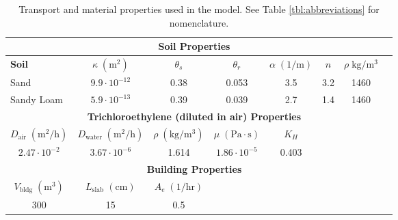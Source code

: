 \begin{table}[htb!]
  \setlength{\tabcolsep}{1pt}
  \centering
  \begin{tabular}{l c c c c c c c}
    \toprule
    \multicolumn{7}{c}{\textbf{Soil Properties}\cite{abreu_conceptual_2012,u.s._environmental_protection_agency_userss_2004}} \\
    \midrule
    \textbf{Soil} & \textbf{$\kappa \; \mathrm{(m^2)}$} & \textbf{$\theta_s$} & \textbf{$\theta_r$} & \textbf{$\alpha \; \mathrm{(1/m)}$} & \textbf{$n$} & \textbf{$\rho \; \mathrm{kg/m^3}$} \\
    Sand & $9.9 \cdot 10^{-12}$ & 0.38 & 0.053 & 3.5 & 3.2 & 1460 \\
    Sandy Loam & $5.9 \cdot 10^{-13}$ & 0.39 & 0.039 & 2.7 & 1.4 & 1460 \\
    \midrule
    \multicolumn{7}{c}{\textbf{Trichloroethylene (diluted in air) Properties}\cite{abreu_conceptual_2012,u.s._environmental_protection_agency_userss_2004}} \\
    \midrule
    \multicolumn{1}{c}{\textbf{$D_\mathrm{air} \; \mathrm{(m^2/h)}$}} & \textbf{$D_\mathrm{water} \; \mathrm{(m^2/h)}$} & \textbf{$\rho \; \mathrm{(kg/m^3)}$} & \textbf{$\mu \; \mathrm{(Pa \cdot s)}$} & \textbf{$K_H$} \\
    \multicolumn{1}{c}{$2.47 \cdot 10^{-2}$} & $3.67 \cdot 10^{-6}$ & 1.614 & $1.86 \cdot 10^{-5}$ & 0.403 \\
    \midrule
    \multicolumn{7}{c}{\textbf{Building Properties}} \\
    \midrule
    \multicolumn{1}{c}{\textbf{$V_\mathrm{bldg} \; \mathrm{(m^3)}$}} & \textbf{$L_\mathrm{slab} \; \mathrm{(cm)}$} & \textbf{$A_e \; \mathrm{(1/hr)}$} \\
    \multicolumn{1}{c}{300} & 15 & 0.5 \\
    \bottomrule
  \end{tabular}
  \caption{Transport and material properties used in the model. See Table \ref{tbl:abbreviations} for nomenclature.}\label{tbl:model}
\end{table}
